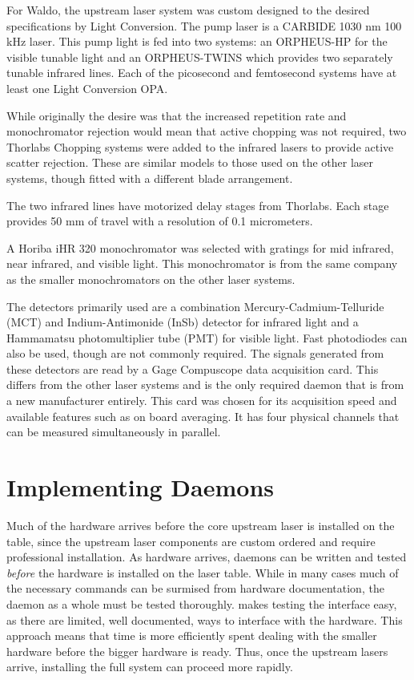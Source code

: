 For Waldo, the upstream laser system was custom designed to the desired specifications by Light Conversion.
The pump laser is a CARBIDE 1030 nm 100 kHz laser\cite{lightcon_carbide}.
This pump light is fed into two systems: an ORPHEUS-HP for the visible tunable light and an ORPHEUS-TWINS which provides two separately tunable infrared lines.
Each of the picosecond and femtosecond systems have at least one Light Conversion OPA.

While originally the desire was that the increased repetition rate and monochromator rejection would mean that active chopping was not required, two Thorlabs Chopping systems\cite{thorlabs_mc2000b} were added to the infrared lasers to provide active scatter rejection.
These are similar models to those used on the other laser systems, though fitted with a different blade arrangement.

The two infrared lines have motorized delay stages from Thorlabs\cite{thorlabs_lnr502e}.
Each stage provides 50 mm of travel with a resolution of 0.1 micrometers.

A Horiba iHR 320 monochromator\cite{horiba_ihr} was selected with gratings for mid infrared, near infrared, and visible light.
This monochromator is from the same company as the smaller monochromators on the other laser systems.

The detectors primarily used are a combination Mercury-Cadmium-Telluride (MCT) and Indium-Antimonide (InSb) detector for infrared light and a Hammamatsu photomultiplier tube (PMT) for visible light.
Fast photodiodes can also be used, though are not commonly required.
The signals generated from these detectors are read by a Gage Compuscope data acquisition card\cite{gage_octave}.
This differs from the other laser systems and is the only required daemon that is from a new manufacturer entirely.
This card was chosen for its acquisition speed and available features such as on board averaging.
It has four physical channels that can be measured simultaneously in parallel.


\clearpage

\section{Implementing Daemons}  %

Much of the hardware arrives before the core upstream laser is installed on the table, since the upstream laser components are custom ordered and require professional installation.
As hardware arrives, \yaq{} daemons can be written and tested \textit{before} the hardware is installed on the laser table.
While in many cases much of the necessary commands can be surmised from hardware documentation, the daemon as a whole must be tested thoroughly.
\yaq{} makes testing the interface easy, as there are limited, well documented, ways to interface with the hardware.
This approach means that time is more efficiently spent dealing with the smaller hardware before the bigger hardware is ready.
Thus, once the upstream lasers arrive, installing the full system can proceed more rapidly.

